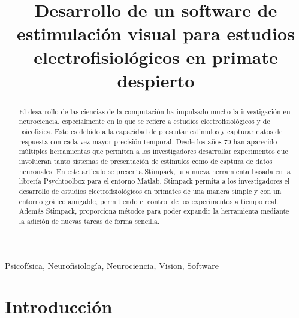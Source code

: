 \documentclass[conference]{IEEEtran}
\begin{document}
\title{Desarrollo de un software de estimulación visual para estudios electrofisiológicos en primate
despierto\\
}

\author{
\and
{}
}

\maketitle

\begin{abstract}

El desarrollo de las ciencias de la computación ha impulsado mucho la investigación en neurociencia, especialmente en lo que se refiere a estudios electrofisiológicos y de psicofísica. Esto es debido a la capacidad de presentar estímulos y capturar datos de respuesta con cada vez mayor precisión temporal. Desde los años 70 han aparecido múltiples herramientas que permiten a los investigadores desarrollar experimentos que involucran tanto sistemas de presentación de estímulos como de captura de datos neuronales. En este artículo se presenta Stimpack, una nueva herramienta basada en la librería Psychtoolbox para el entorno Matlab. Stimpack permita a los investigadores el desarrollo de estudios electrofisiológicos en primates de una manera simple y con un entorno gráfico amigable, permitiendo el control de los experimentos a tiempo real. Además Stimpack, proporciona métodos para poder expandir la herramienta mediante la adición de nuevas tareas de forma sencilla. 

\end{abstract}
\begin{IEEEkeywords}
Psicofísica, Neurofisiología, Neurociencia, Vision, Software
\end{IEEEkeywords}

\section{Introducción}
\end{document}
